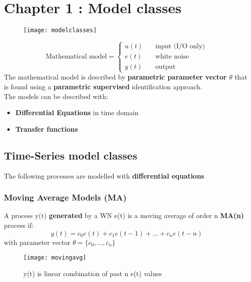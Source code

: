\section{Chapter 1 : Model classes}
\begin{figure}[!h]
  \centering
  \texttt{[image: modelclasses]}
\end{figure}
\[ \text{Mathematical model} =
\begin{cases}
	u(t) & \quad \text{input (I/O only)}\\
	e(t) & \quad \text{white noise}\\
	y(t) & \quad \text{output}
\end{cases}
\]
The mathematical model is described by \textbf{parametric parameter vector $\theta$ }that is found using a \textbf{parametric supervised} identification approach.\\
The models can be described with:
\begin{itemize}
\item \textbf{Differential Equations} in time domain
\item \textbf{Transfer functions}
\end{itemize}
\subsection{Time-Series model classes}
The following processes are modelled with \textbf{differential equations}
\subsubsection{Moving Average Models (MA)}
A process y(t) \textbf{generated} by a WN e(t) is a moving average of order n   
 \textbf{MA(n)} process if: 
$$ y(t) = c_0e(t)+c_1e(t-1)+...+c_ne(t-n)$$ 
with parameter vector $ \theta = \{c_0 ,...,c_n\}$
\newpage
\begin{figure}[!ht]
  \centering
  \texttt{[image: movingavg]}
  \caption{y(t) is linear combination of past n e(t) values}
\end{figure}
